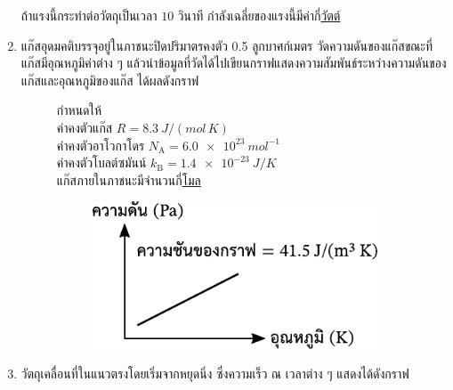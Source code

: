 \documentclass[a4paper, 12pt]{article}
\begin{document}
\begin{enumerate}
\begin{figure}[H]
          \end{figure}
          ถ้าแรงนี้กระทำต่อวัตถุเป็นเวลา \(10\) วินาที กำลังเฉลี่ยของแรงนี้มีค่ากี่\underline{วัตต์}\
          \vspace*{2cm}
    \item แก๊สอุดมคติบรรจุอยู่ในภาชนะปิดปริมาตรคงตัว 0.5 ลูกบาศก์เมตร วัดความดันของแก๊สขณะที่แก๊สมีอุณหภูมิค่าต่าง ๆ แล้วนำข้อมูลที่วัดได้ไปเขียนกราฟแสดงความสัมพันธ์ระหว่างความดันของแก๊สและอุณหภูมิของแก๊ส ได้ผลดังกราฟ \\
          \begin{figure}[H]
              \begin{minipage}[ht]{0.5\linewidth}
                  กำหนดให้ \\
                  ค่าคงตัวแก๊ส \(R = \SI{8.3}{J/(mol\,K)}\) \\
                  ค่าคงตัวอาโวกาโดร \(N_\text{A} = \SI{6.0e23}{mol^{-1}}\) \\
                  ค่าคงตัวโบลต์ซมันน์ \(k_\text{B} = \SI{1.4e-23}{J/K}\) \\
                  แก๊สภายในภาชนะมีจำนวนกี่\underline{โมล}
              \end{minipage}
              \begin{minipage}[ht]{0.5\linewidth}
                  \begin{figure}[H]
                      \raggedright
                      \includegraphics{images/28_28.pdf}
                  \end{figure}
              \end{minipage}
          \end{figure}
          \vspace*{2cm}
    \item วัตถุเคลื่อนที่ในแนวตรงโดยเริ่มจากหยุดนิ่ง ซึ่งความเร็ว ณ เวลาต่าง ๆ แสดงได้ดังกราฟ \\
          \begin{figure}[H]
              \centering

\end{figure}
\end{enumerate}
\end{document}
